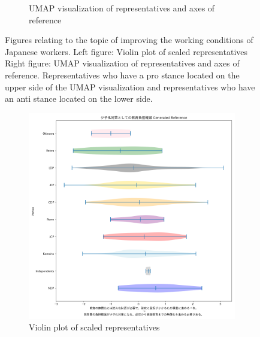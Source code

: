 \documentclass[final,5p,times,twocolumn,authoryear]{elsarticle}
\begin{document}
\begin{figure}[h]
\begin{subfigure}{0.22\textwidth}
      \caption{UMAP visualization of representatives and axes of reference}
    \end{subfigure}
\caption{Figures relating to the topic of improving the working conditions of Japanese workers. Left figure: Violin plot of scaled representatives Right figure: UMAP visualization of representatives and axes of reference. Representatives who have a pro stance located on the upper side of the UMAP visualization and representatives who have an anti stance located on the lower side.}
\label{fig: results-aging-working-condition}
\end{figure}


\begin{figure}[h]
\centering
    \begin{subfigure}{0.22\textwidth}
      \centering
      \includegraphics[width=1\linewidth]{figs/results/aging/少子化対策としての教育負担軽減_gen_violin_plot.png}
      \caption{Violin plot of scaled representatives}
    \end{subfigure}
    \begin{subfigure}{0.22\textwidth}
      \centering

\end{subfigure}
\end{figure}
\end{document}
